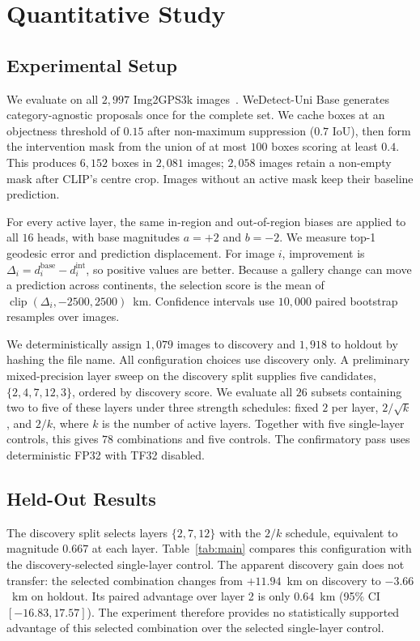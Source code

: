 \section{Quantitative Study}
\label{sec:experiments}

\subsection{Experimental Setup}

We evaluate on all $2{,}997$ Img2GPS3k images~\cite{vo2017revisiting}.
WeDetect-Uni Base generates category-agnostic proposals once for the complete
set. We cache boxes at an objectness threshold of $0.15$ after non-maximum
suppression ($0.7$ IoU), then form the intervention mask from the union of at
most $100$ boxes scoring at least $0.4$. This produces $6{,}152$ boxes in
$2{,}081$ images; $2{,}058$ images retain a non-empty mask after CLIP's centre
crop. Images without an active mask keep their baseline prediction.

For every active layer, the same in-region and out-of-region biases are applied
to all $16$ heads, with base magnitudes $a=+2$ and $b=-2$. We measure top-1
geodesic error and
prediction displacement. For image $i$, improvement is
$\Delta_i=d_i^{\mathrm{base}}-d_i^{\mathrm{int}}$, so positive values are
better. Because a gallery change can move a prediction across continents, the
selection score is the mean of
$\operatorname{clip}(\Delta_i,-2500,2500)$~km. Confidence intervals use
$10{,}000$ paired bootstrap resamples over images.

We deterministically assign $1{,}079$ images to discovery and $1{,}918$ to
holdout by hashing the file name. All configuration choices use discovery
only. A
preliminary mixed-precision layer sweep on the discovery split supplies five candidates,
$\{2,4,7,12,3\}$, ordered by discovery score. We evaluate all $26$ subsets containing two to five of
these layers under three strength schedules: fixed $2$ per layer,
$2/\sqrt{k}$, and $2/k$, where $k$ is the number of active layers. Together
with five single-layer controls, this gives $78$ combinations and five
controls. The confirmatory pass uses deterministic FP32 with TF32 disabled.

\subsection{Held-Out Results}

The discovery split selects layers $\{2,7,12\}$ with the $2/k$ schedule,
equivalent to magnitude $0.667$ at each layer. Table~\ref{tab:main} compares
this configuration with the discovery-selected single-layer control. The
apparent discovery gain does not transfer: the selected combination changes
from $+11.94$~km on discovery to $-3.66$~km on holdout. Its paired advantage
over layer 2 is only $0.64$~km (95\% CI $[-16.83,17.57]$). The experiment
therefore provides no statistically supported advantage of this selected
combination over the selected single-layer control.

